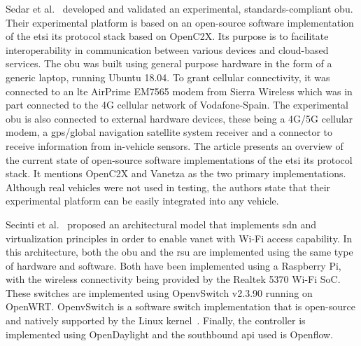 	
Sedar et al.~\cite{sedar_standards-compliant_2021} developed and validated an experimental, standards-compliant \gls{obu}. Their experimental platform is based on an open-source software implementation of the \gls{etsi} \gls{its} protocol stack based on OpenC2X. Its purpose is to facilitate interoperability in communication between various devices and cloud-based services.
The \gls{obu} was built using general purpose hardware in the form of a generic laptop, running Ubuntu 18.04. To grant cellular connectivity, it was connected to an \gls{lte} AirPrime EM7565 modem from Sierra Wireless which was in part connected to the 4G cellular network of Vodafone-Spain. The experimental \gls{obu} is also connected to external hardware devices, these being a 4G/5G cellular modem, a \gls{gps}/global navigation satellite system receiver and a connector to receive information from in-vehicle sensors.
The article presents an overview of the current state of open-source software implementations of the \gls{etsi} \gls{its} protocol stack. It mentions OpenC2X and Vanetza as the two primary implementations. 
Although real vehicles were not used in testing, the authors state that their experimental platform can be easily integrated into any vehicle.


Secinti et al.~\cite{secinti_software_2017} proposed an architectural model that implements \gls{sdn} and virtualization principles in order to enable \gls{vanet} with Wi-Fi access capability. 
In this architecture, both the \gls{obu} and the \gls{rsu} are implemented using the same type of hardware and software. Both have been implemented using a Raspberry Pi, with the wireless connectivity being provided by the Realtek 5370 Wi-Fi SoC.
These switches are implemented using OpenvSwitch v2.3.90 running on OpenWRT. OpenvSwitch is a software switch implementation that is open-source and natively supported by the Linux kernel~\cite{noauthor_open_nodate-2}. Finally, the controller is implemented using OpenDaylight and the southbound \gls{api} used is Openflow.


